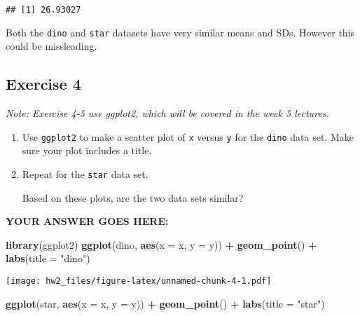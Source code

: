 \documentclass[
]{article}
\newenvironment{Shaded}{\begin{snugshade}}{\end{snugshade}}
\newcommand{\DataTypeTok}[1]{\textcolor[rgb]{0.13,0.29,0.53}{#1}}
\newcommand{\KeywordTok}[1]{\textcolor[rgb]{0.13,0.29,0.53}{\textbf{#1}}}
\newcommand{\NormalTok}[1]{#1}
\newcommand{\OperatorTok}[1]{\textcolor[rgb]{0.81,0.36,0.00}{\textbf{#1}}}
\newcommand{\StringTok}[1]{\textcolor[rgb]{0.31,0.60,0.02}{#1}}
\begin{document}
\begin{verbatim}
## [1] 26.93027
\end{verbatim}

Both the \texttt{dino} and \texttt{star} datasets have very similar
means and SDs. However this could be missleading.

\hypertarget{exercise-4}{%
\subsection{Exercise 4}\label{exercise-4}}

\emph{Note: Exercise 4-5 use ggplot2, which will be covered in the week
5 lectures.}

\begin{enumerate}
\def\labelenumi{\arabic{enumi}.}
\item
  Use \texttt{ggplot2} to make a scatter plot of \texttt{x} versus
  \texttt{y} for the \texttt{dino} data set. Make sure your plot
  includes a title.
\item
  Repeat for the \texttt{star} data set.

  Based on these plots, are the two data sets similar?
\end{enumerate}

\textbf{YOUR ANSWER GOES HERE:}

\begin{Shaded}
\begin{Highlighting}[]
\KeywordTok{library}\NormalTok{(ggplot2)}
\KeywordTok{ggplot}\NormalTok{(dino, }\KeywordTok{aes}\NormalTok{(}\DataTypeTok{x =}\NormalTok{ x, }\DataTypeTok{y =}\NormalTok{ y)) }\OperatorTok{+}\StringTok{ }\KeywordTok{geom\_point}\NormalTok{() }\OperatorTok{+}\StringTok{ }\KeywordTok{labs}\NormalTok{(}\DataTypeTok{title =} \StringTok{"dino"}\NormalTok{)}
\end{Highlighting}
\end{Shaded}

\texttt{[image: hw2\_files/figure-latex/unnamed-chunk-4-1.pdf]}

\begin{Shaded}
\begin{Highlighting}[]
\KeywordTok{ggplot}\NormalTok{(star, }\KeywordTok{aes}\NormalTok{(}\DataTypeTok{x =}\NormalTok{ x, }\DataTypeTok{y =}\NormalTok{ y)) }\OperatorTok{+}\StringTok{ }\KeywordTok{geom\_point}\NormalTok{() }\OperatorTok{+}\StringTok{ }\KeywordTok{labs}\NormalTok{(}\DataTypeTok{title =} \StringTok{"star"}\NormalTok{)}
\end{Highlighting}
\end{Shaded}
\end{document}
